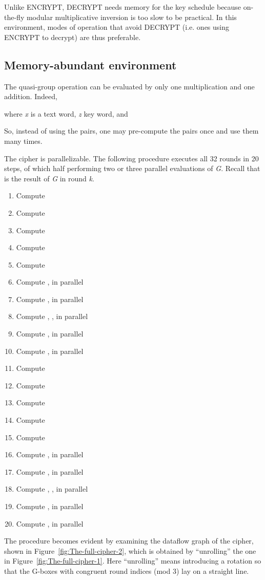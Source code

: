 \documentclass[a4paper,oneside,english]{amsart}
\numberwithin{equation}{section}
\numberwithin{figure}{section}
\begin{document}
Unlike ENCRYPT, DECRYPT needs memory for the key schedule because
on-the-fly modular multiplicative inversion is too slow to be practical.
In this environment, modes of operation that avoid DECRYPT (i.e. ones
using ENCRYPT to decrypt) are thus preferable.


\subsection{Memory-abundant environment}

The quasi-group operation  can be evaluated
by only one multiplication and one addition. Indeed, 




where \emph{x} is a text word, \emph{z} key word, and







So, instead of using the  pairs, one may pre-compute the 
pairs once and use them many times.

The cipher is parallelizable. The following procedure executes all
32 rounds in 20 steps, of which half performing two or three parallel
evaluations of \emph{G}. Recall that  is the result of \emph{G}
in round \emph{k}.
\begin{enumerate}
\item Compute 
\item Compute 
\item Compute 
\item Compute 
\item Compute 
\item Compute ,  in parallel
\item Compute ,  in parallel
\item Compute , ,  in parallel
\item Compute ,  in parallel
\item Compute ,  in parallel
\item Compute 
\item Compute 
\item Compute 
\item Compute 
\item Compute 
\item Compute ,  in parallel
\item Compute ,  in parallel
\item Compute , ,  in parallel
\item Compute ,  in parallel
\item Compute ,  in parallel
\end{enumerate}
The procedure becomes evident by examining the dataflow graph of the
cipher, shown in Figure~\ref{fig:The-full-cipher-2}, which is obtained
by {}``unrolling'' the one in Figure~\ref{fig:The-full-cipher-1}.
Here {}``unrolling'' means introducing a rotation so that the G-boxes
with congruent round indices (mod 3) lay on a straight line.
\end{document}
